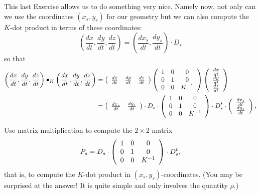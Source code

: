 This last Exercise allows us to do something very nice. Namely now, not only
can we use the coordinates $\left(  x_{s},y_{s}\right)  $ for our geometry but
we can also compute the $K$-dot product in terms of these coordinates:%
\[
\left(  \frac{dx}{dt},\frac{dy}{dt},\frac{dz}{dt}\right)  =\left(
\frac{dx_{s}}{dt},\frac{dy_{s}}{dt}\right)  \cdot D_{s}%
\]
so that%
\begin{align*}
\left(  \frac{dx}{dt},\frac{dy}{dt},\frac{dz}{dt}\right)  \bullet_{K}\left(
\frac{dx}{dt},\frac{dy}{dt},\frac{dz}{dt}\right)   &  =\left(
\begin{array}
[c]{ccc}%
\frac{dx}{dt} & \frac{dy}{dt} & \frac{dz}{dt}%
\end{array}
\right)  \left(
\begin{array}
[c]{ccc}%
1 & 0 & 0\\
0 & 1 & 0\\
0 & 0 & K^{-1}%
\end{array}
\right)  \left(
\begin{array}
[c]{c}%
\frac{dx}{dt}\\
\frac{dy}{dt}\\
\frac{dz}{dt}%
\end{array}
\right) \\
&  =\left(
\begin{array}
[c]{cc}%
\frac{dx_{s}}{dt} & \frac{dy_{s}}{dt}%
\end{array}
\right)  \cdot D_{s}\cdot\left(
\begin{array}
[c]{ccc}%
1 & 0 & 0\\
0 & 1 & 0\\
0 & 0 & K^{-1}%
\end{array}
\right)  \cdot D_{s}^{t}\cdot\left(
\begin{array}
[c]{c}%
\frac{dx_{s}}{dt}\\
\frac{dy_{s}}{dt}%
\end{array}
\right)  ,
\end{align*}


\begin{exercise}
\label{36}Use matrix multiplication to compute the $2\times2$ matrix%
\[
P_{s}=D_{s}\cdot\left(
\begin{array}
[c]{ccc}%
1 & 0 & 0\\
0 & 1 & 0\\
0 & 0 & K^{-1}%
\end{array}
\right)  \cdot D_{s}^{t},
\]
that is, to compute the $K$-dot product in $\left(  x_{s},y_{s}\right)
$-coordinates. (You may be surprised at the answer! It is quite simple and
only involves the quantity $\rho$.)
\end{exercise}

